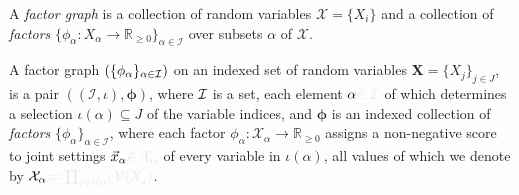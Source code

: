 \documentclass{article}
\theoremstyle{plain}
\theoremstyle{definition}
\theoremstyle{remark}
\newcommand{\notation}[2][]{#1}
\renewcommand{\notation}[2][]{{\color{notationcolor} #2}}
\numberwithin{equation}{section}
\begin{document}
	\begin{quickdefn}
	A \emph{factor graph} is a collection of random variables $\mathcal X = \{X_i\}$ and a collection of \emph{factors} $\{\phi_\alpha\colon X_\alpha \to \mathbb R_{\geq0}\}_{\alpha \in \mathcal I }$ over subsets $\alpha$ of $\mathcal X$.
	\end{quickdefn}
	\begin{defn}
		A factor graph $ (\{\phi_\alpha\}_{\alpha \in \cal I})$ on an indexed set of random variables $\mathbf X = \{ X_j \}_{j \in J}$, 
		is a pair $((\mathcal I,\iota), \boldsymbol\phi)$, where $\cal I$ is a set,
		each element $\alpha\notation{\in \mathcal I}$ of which determines a selection $\iota(\alpha) \subseteq J$ of the variable indices, and
		$\boldsymbol\phi$ is an indexed collection of \emph{factors} $\{\phi_\alpha\}_{\alpha \in \mathcal I }$, 
		where each factor $\phi_\alpha \colon \mathcal X_\alpha \to \mathbb R_{\geq 0}$ assigns a non-negative score to joint settings $\vec x_\alpha \notation{\in \mathcal X_\alpha}$ of every variable in $\iota(\alpha)$, all values of which we denote by $\mathcal X_\alpha\notation{ := \prod_{j \in \iota(\alpha)} \mathcal V(X_j)}$. 
	\end{defn}
\end{document}
